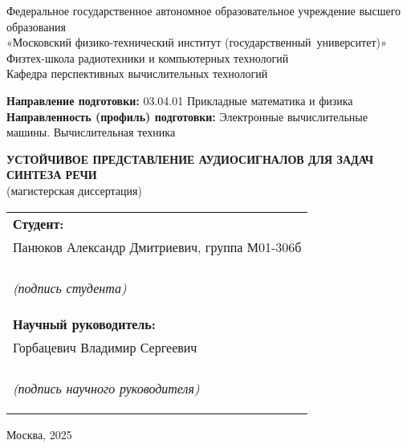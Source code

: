 \begin{center}
    Федеральное государственное автономное образовательное учреждение высшего образования\\
    «Московский физико-технический институт \pt(государственный~университет)»\\

    Физтех-школа радиотехники и компьютерных технологий\\
    Кафедра перспективных вычислительных технологий\\
\end{center}

\noindent
\textbf{Направление подготовки:} 03.04.01 Прикладные математика и физика\\
\textbf{Направленность (профиль) подготовки:} Электронные  вычислительные машины. Вычислительная техника\\

\begin{center}

    \textbf{УСТОЙЧИВОЕ ПРЕДСТАВЛЕНИЕ АУДИОСИГНАЛОВ ДЛЯ ЗАДАЧ СИНТЕЗА РЕЧИ}\\
    (магистерская диссертация)\\[15mm]

\end{center}


\hfill\begin{tabular}{@{}p{.5\linewidth}@{}}

    \textbf{Студент:}\\
    Панюков Александр Дмитриевич, группа М01-306б\\
    \uline{\hfill}\\
    \begin{center}\textit{(подпись студента)}\end{center}\\

    \textbf{Научный руководитель:}\\
    Горбацевич Владимир Сергеевич\\
    \uline{\hfill}\\
    \begin{center}\textit{(подпись научного руководителя)}\end{center}\\

\end{tabular}


\vfill

\begin{center}
    Москва, 2025
\end{center}

\thispagestyle{empty}
